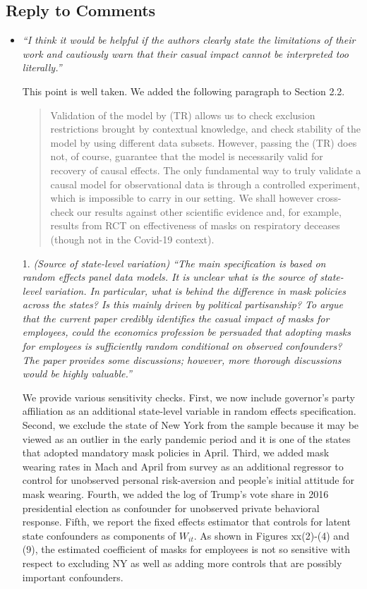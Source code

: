 \documentclass[11pt]{article}
\begin{document}
\subsection*{Reply to Comments}
\begin{itemize}

\item  \textit{``I think it would be helpful if the authors clearly state the limitations of their work and
cautiously warn that their casual impact cannot be interpreted too literally.''}
 
 This point is well taken. We added the following paragraph to Section 2.2. 
 \begin{quote}
 Validation of the model by (TR) allows us to check exclusion restrictions brought by contextual knowledge, and check stability of the model by using different data subsets. However, passing the (TR) does not, of course, guarantee that the model is necessarily valid for recovery of causal effects. The only fundamental way to truly validate a causal model for observational data is through a controlled experiment, which is impossible to carry in our setting. We shall however cross-check our results against other scientific evidence and, for example, results from RCT on effectiveness of masks on respiratory deceases (though not in the Covid-19 context).
 \end{quote}
  
\item[1.]   \textit{(Source of state-level variation) ``The main specification is based on random effects panel data
models. It is unclear what is the source of state-level variation. In particular, what is behind
the difference in mask policies across the states? Is this mainly driven by political partisanship?
To argue that the current paper credibly identifies the casual impact of masks for
employees, could the economics profession be persuaded that adopting masks for employees
is sufficiently random conditional on observed confounders? The paper provides some
discussions; however, more thorough discussions would be highly valuable.''}
  
We provide various sensitivity checks. First, we now include governor's party affiliation as an additional state-level variable in random effects specification. 
Second, we exclude the state of New York from the sample because it may be viewed as an
outlier in the early pandemic period and it is  one of the states that adopted mandatory mask policies in April. Third, we added mask wearing rates in Mach and April from survey as an additional regressor to control for unobserved personal risk-aversion and people's initial attitude for mask wearing. Fourth,  we added the log of Trump's vote share in 2016 presidential election as confounder for
unobserved private behavioral response. Fifth, we report the fixed effects estimator that controls for latent state confounders as components of $W_{it}$.  
As shown in Figures xx(2)-(4) and (9), the estimated coefficient of masks for employees is not so sensitive with respect to excluding NY as well as adding more controls that are possibly important confounders.  


\end{itemize}
\end{document}
